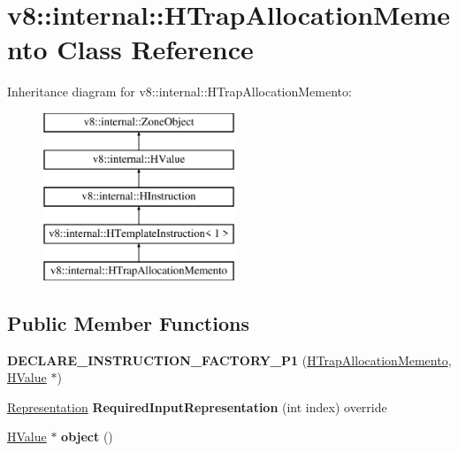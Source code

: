 \hypertarget{classv8_1_1internal_1_1_h_trap_allocation_memento}{}\section{v8\+:\+:internal\+:\+:H\+Trap\+Allocation\+Memento Class Reference}
\label{classv8_1_1internal_1_1_h_trap_allocation_memento}
Inheritance diagram for v8\+:\+:internal\+:\+:H\+Trap\+Allocation\+Memento\+:\begin{figure}[H]
\begin{center}
\leavevmode
\includegraphics[height=5.000000cm]{classv8_1_1internal_1_1_h_trap_allocation_memento}
\end{center}
\end{figure}
\subsection*{Public Member Functions}
\begin{DoxyCompactItemize}
\item 
{\bfseries D\+E\+C\+L\+A\+R\+E\+\_\+\+I\+N\+S\+T\+R\+U\+C\+T\+I\+O\+N\+\_\+\+F\+A\+C\+T\+O\+R\+Y\+\_\+\+P1} (\hyperlink{classv8_1_1internal_1_1_h_trap_allocation_memento}{H\+Trap\+Allocation\+Memento}, \hyperlink{classv8_1_1internal_1_1_h_value}{H\+Value} $\ast$)\hypertarget{classv8_1_1internal_1_1_h_trap_allocation_memento_a7784a2fbdaa5844286136ff53284ae8d}{}\label{classv8_1_1internal_1_1_h_trap_allocation_memento_a7784a2fbdaa5844286136ff53284ae8d}

\item 
\hyperlink{classv8_1_1internal_1_1_representation}{Representation} {\bfseries Required\+Input\+Representation} (int index) override\hypertarget{classv8_1_1internal_1_1_h_trap_allocation_memento_a8b10103f7db3424e5228387a33cfa748}{}\label{classv8_1_1internal_1_1_h_trap_allocation_memento_a8b10103f7db3424e5228387a33cfa748}

\item 
\hyperlink{classv8_1_1internal_1_1_h_value}{H\+Value} $\ast$ {\bfseries object} ()\hypertarget{classv8_1_1internal_1_1_h_trap_allocation_memento_ab3598e1b34287fae2475eda456b70a9f}{}\label{classv8_1_1internal_1_1_h_trap_allocation_memento_ab3598e1b34287fae2475eda456b70a9f}

\end{DoxyCompactItemize}
